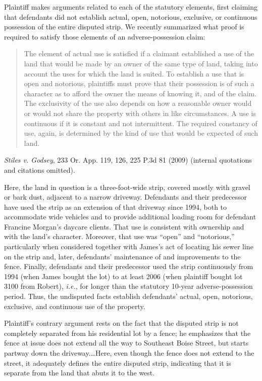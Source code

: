 Plaintiff makes arguments related to each of the statutory elements, first
claiming that defendants did not establish actual, open, notorious, exclusive,
or continuous possession of the entire disputed strip. We recently summarized
what proof is required to satisfy those elements of an adverse-possession
claim:
\begin{quote}
The element of actual use is satisfied if a claimant established a use of
the land that would be made by an owner of the same type of land, taking into
account the uses for which the land is suited. To establish a use that is open
and notorious, plaintiffs must prove that their possession is of such a
character as to afford the owner the means of knowing it, and of the claim. The
exclusivity of the use also depends on how a reasonable owner would or would
not share the property with others in like circumstances. A use is continuous
if it is constant and not intermittent. The required constancy of use,
again, is determined by the kind of use that would be expected of such land.
\end{quote}
\textit{Stiles v. Godsey}, 233 Or. App. 119, 126, 225 P.3d 81 (2009) (internal
quotations and citations omitted).

Here, the land in question is a three-foot-wide strip, covered mostly with
gravel or bark dust, adjacent to a narrow driveway. Defendants and their
predecessor have used the strip as an extension of that driveway since 1994,
both to accommodate wide vehicles and to provide additional loading room for
defendant Francine Morgan's daycare clients. That use is consistent with
ownership and with the land's character. Moreover, that use was ``open'' and
``notorious,'' particularly when considered together with James's act of
locating his sewer line on the strip and, later, defendants' maintenance of and
improvements to the fence. Finally, defendants and their predecessor used the
strip continuously from 1994 (when James bought the lot) to at least 2006 (when
plaintiff bought lot 3100 from Robert), \textit{i.e.}, for longer than the
statutory 10-year adverse-possession period. Thus, the undisputed facts
establish defendants' actual, open, notorious, exclusive, and continuous use of
the property.

Plaintiff's contrary argument rests on the fact that the disputed strip is not
completely separated from his residential lot by a fence; he emphasizes that
the fence at issue does not extend all the way to Southeast Boise Street, but
starts partway down the driveway.\ldots Here, even though the fence does not
extend to the street, it adequately defines the entire disputed strip,
indicating that it is separate from the land that abuts it to the west.


